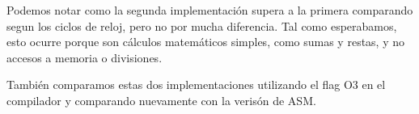 \documentclass[a4paper]{article}
\begin{document}
\begin{figure}[!ht]
    \centering
    \begin{floatrow}
    \end{floatrow}
\end{figure}


Podemos notar como la segunda implementación supera a la primera comparando segun los ciclos de reloj, pero no por mucha diferencia. Tal como esperabamos,
esto ocurre porque son cálculos matemáticos simples, como sumas y restas, y no accesos a memoria o divisiones.

También comparamos estas dos implementaciones utilizando el flag O3 en el compilador y comparando nuevamente con la verisón de ASM.
\begin{figure}[!ht]
    \centering
    \begin{floatrow}
    \end{floatrow}
\end{figure}
\end{document}
